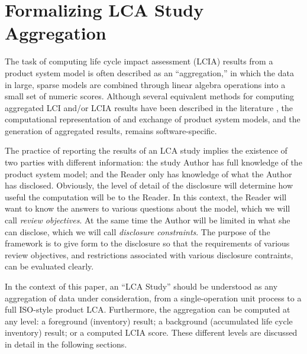 \section{Formalizing LCA Study Aggregation}

The task of computing life cycle impact assessment (LCIA) results from a product system model is often described as an ``aggregation,'' in which the data in large, sparse models are combined through linear algebra operations into a small set of numeric scores.  Although several equivalent methods for computing aggregated LCI and/or LCIA results have been described in the literature \citep{Suh_2005, Peters_2007}, the computational representation of and exchange of product system models, and the generation of aggregated results, remains software-specific.  

The practice of reporting the results of an LCA study implies the existence of two parties with different information: the study Author has full knowledge of the product system model; and the Reader only has knowledge of what the Author has disclosed.  Obviously, the level of detail of the disclosure will determine how useful the computation will be to the Reader.  In this context, the Reader will want to know the answers to various questions about the model, which we will call \emph{review objectives}.  
At the same time the Author will be limited in what she can disclose, which we will call \emph{disclosure constraints}.  The purpose of the framework is to give form to the disclosure so that the requirements of various review objectives, and restrictions associated with various disclosure contraints, can be evaluated clearly.

In the context of this paper, an ``LCA Study'' should be understood as any aggregation of data under consideration, from a single-operation unit process to a full ISO-style product LCA.  Furthermore, the aggregation can be computed at any level: a foreground (inventory) result; a background (accumulated life cycle inventory) result; or a computed LCIA score.  These different levels are discussed in detail in the following sections.  

